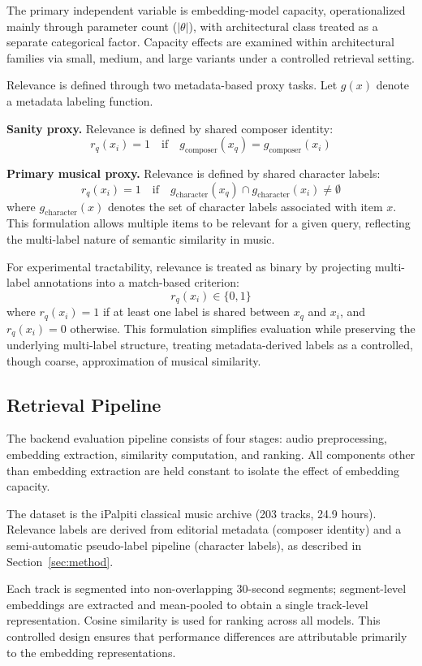 \documentclass{article}
\begin{document}
The primary independent variable is embedding-model capacity, operationalized mainly through
parameter count ($|\theta|$), with architectural class treated as a separate categorical factor.
Capacity effects are examined within architectural families via small, medium, and large variants
under a controlled retrieval setting.

Relevance is defined through two metadata-based proxy tasks. Let $g(x)$ denote a metadata labeling
function.

\textbf{Sanity proxy.} Relevance is defined by shared composer identity:
\[
r_q(x_i) = 1 \quad \text{if} \quad g_{\text{composer}}(x_q) = g_{\text{composer}}(x_i)
\]

\textbf{Primary musical proxy.} Relevance is defined by shared character labels:
\[
r_q(x_i) = 1 \quad \text{if} \quad g_{\text{character}}(x_q) \cap g_{\text{character}}(x_i) \neq \emptyset
\]
where $g_{\text{character}}(x)$ denotes the set of character labels associated with item $x$.
This formulation allows multiple items to be relevant for a given query, reflecting the multi-label
nature of semantic similarity in music.

For experimental tractability, relevance is treated as binary by projecting multi-label annotations
into a match-based criterion:
\[
r_q(x_i) \in \{0,1\}
\]
where $r_q(x_i)=1$ if at least one label is shared between $x_q$ and $x_i$, and $r_q(x_i)=0$
otherwise. This formulation simplifies evaluation while preserving the underlying multi-label
structure, treating metadata-derived labels as a controlled, though coarse, approximation of
musical similarity.

\subsection{Retrieval Pipeline}

The backend evaluation pipeline consists of four stages: audio preprocessing, embedding extraction, similarity computation, and ranking. All components other than embedding extraction are held constant to isolate the effect of embedding capacity.

The dataset is the iPalpiti classical music archive (203 tracks, 24.9 hours). Relevance labels are derived from editorial metadata (composer identity) and a semi-automatic pseudo-label pipeline (character labels), as described in Section~\ref{sec:method}.

Each track is segmented into non-overlapping 30-second segments; segment-level embeddings are extracted and mean-pooled to obtain a single track-level representation. Cosine similarity is used for ranking across all models. This controlled design ensures that performance differences are attributable primarily to the embedding representations.
\end{document}

